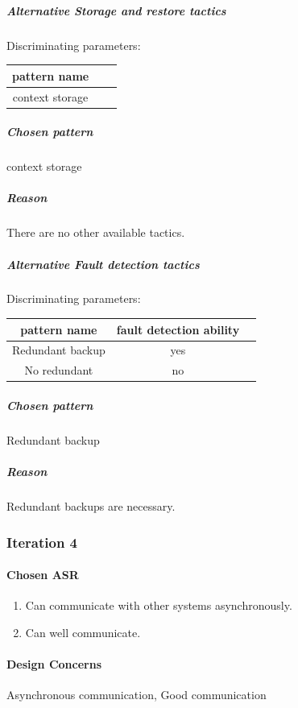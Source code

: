 \documentclass{article}
\begin{document}
		\subparagraph{Alternative Storage and restore tactics}
		Discriminating parameters:\\
		\begin{center}
			\begin{tabular}{|c|c|c|}
				\hline
				pattern name\\
				\hline
				context storage\\
				\hline
			\end{tabular}
		\end{center}
		\subparagraph{Chosen pattern} 
		context storage
		\subparagraph{Reason} 
		There are no other available tactics.

		\subparagraph{Alternative Fault detection tactics}
		Discriminating parameters:\\
		\begin{center}
			\begin{tabular}{|c|c|c|}
				\hline
				pattern name & fault detection ability\\
				\hline
				Redundant backup & yes\\
				\hline
				No redundant& no\\
				\hline
			\end{tabular}
		\end{center}
		\subparagraph{Chosen pattern} 
		Redundant backup
		\subparagraph{Reason} 
		Redundant backups are necessary.

		\subsubsection{Iteration 4}
		
		\paragraph{Chosen ASR}
			\begin{enumerate}
			\item Can communicate with other systems asynchronously.
			\item Can well communicate.
			\end{enumerate}
			\paragraph{Design Concerns} Asynchronous communication, Good communication
\end{document}
